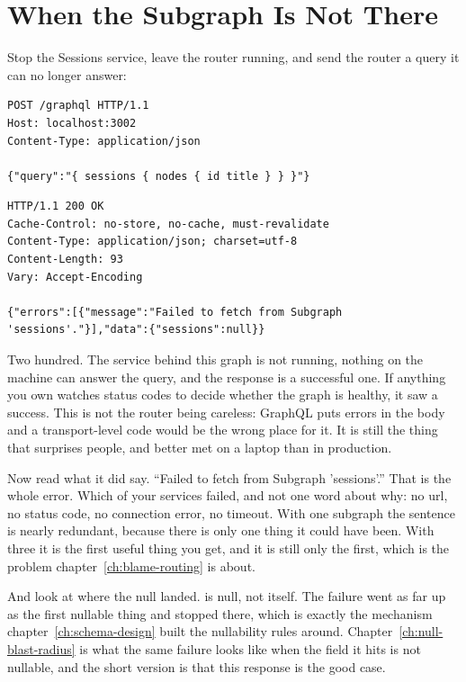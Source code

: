 \section{When the Subgraph Is Not There}
\label{sec:ch08-when-the-subgraph-is-not-there}

%
Stop the Sessions service, leave the router running, and send the router a
query it can no longer answer:

\begin{verbatim}
POST /graphql HTTP/1.1
Host: localhost:3002
Content-Type: application/json

{"query":"{ sessions { nodes { id title } } }"}
\end{verbatim}

\begin{verbatim}
HTTP/1.1 200 OK
Cache-Control: no-store, no-cache, must-revalidate
Content-Type: application/json; charset=utf-8
Content-Length: 93
Vary: Accept-Encoding

{"errors":[{"message":"Failed to fetch from Subgraph 'sessions'."}],"data":{"sessions":null}}
\end{verbatim}

%
Two hundred. The service behind this graph is not running, nothing on the
machine can answer the query, and the response is a successful one. If anything
you own watches status codes to decide whether the graph is healthy, it saw a
success. This is not the router being careless: GraphQL puts errors in the body
and a transport-level code would be the wrong place for it. It is still the
thing that surprises people, and better met on a laptop than in production.

%
Now read what it did say. \enquote{Failed to fetch from Subgraph 'sessions'.} That
is the whole error. Which of your services failed, and not one word about why:
no url, no status code, no connection error, no timeout. With one subgraph the
sentence is nearly redundant, because there is only one thing it could have
been. With three it is the first useful thing you get, and it is still only the
first, which is the problem chapter~\ref{ch:blame-routing} is about.

%
And look at where the null landed.  is null, not
 itself. The failure went as far up as the first nullable thing and
stopped there, which is exactly the mechanism
chapter~\ref{ch:schema-design} built the nullability rules around.
Chapter~\ref{ch:null-blast-radius} is what the same failure looks like when the
field it hits is not nullable, and the short version is that this response is
the good case.

